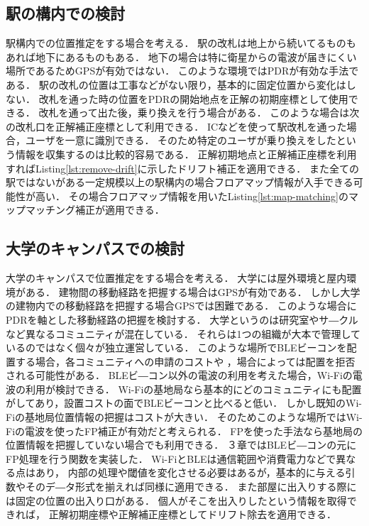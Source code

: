 \subsection{駅の構内での検討}
駅構内での位置推定をする場合を考える．
駅の改札は地上から続いてるものもあれば地下にあるものもある．
地下の場合は特に衛星からの電波が届きにくい場所であるためGPSが有効ではない．
このような環境ではPDRが有効な手法である．
駅の改札の位置は工事などがない限り，基本的に固定位置から変化はしない．
改札を通った時の位置をPDRの開始地点を正解の初期座標として使用できる．
改札を通って出た後，乗り換えを行う場合がある．
このような場合は次の改札口を正解補正座標として利用できる．
ICなどを使って駅改札を通った場合，ユーザを一意に識別できる．
そのため特定のユーザが乗り換えをしたという情報を収集するのは比較的容易である．
正解初期地点と正解補正座標を利用すればListing\ref{lst:remove-drift}に示したドリフト補正を適用できる．
また全ての駅ではないがある一定規模以上の駅構内の場合フロアマップ情報が入手できる可能性が高い．
その場合フロアマップ情報を用いたListing\ref{lst:map-matching}のマップマッチング補正が適用できる．

\subsection{大学のキャンパスでの検討}
大学のキャンパスで位置推定をする場合を考える．
大学には屋外環境と屋内環境がある．
建物間の移動経路を把握する場合はGPSが有効である．
しかし大学の建物内での移動経路を把握する場合GPSでは困難である．
このような場合にPDRを軸とした移動経路の把握を検討する．
大学というのは研究室やサ―クルなど異なるコミュニティが混在している．
それらは1つの組織が大本で管理しているのではなく個々が独立運営している．
このような場所でBLEビーコンを配置する場合，各コミュニティへの申請のコストや
，場合によっては配置を拒否される可能性がある．
BLEビ―コン以外の電波の利用を考えた場合，Wi-Fiの電波の利用が検討できる．
Wi-Fiの基地局なら基本的にどのコミュニティにも配置がしてあり，設置コストの面でBLEビーコンと比べると低い．
しかし既知のWi-Fiの基地局位置情報の把握はコストが大きい．
そのためこのような場所ではWi-Fiの電波を使ったFP補正が有効だと考えられる．
FPを使った手法なら基地局の位置情報を把握していない場合でも利用できる．
３章ではBLEビ―コンの元にFP処理を行う関数を実装した．
Wi-FiとBLEは通信範囲や消費電力などで異なる点はあり，
内部の処理や閾値を変化させる必要はあるが，基本的に与える引数やそのデ―タ形式を揃えれば同様に適用できる．
また部屋に出入りする際には固定の位置の出入り口がある．
個人がそこを出入りしたという情報を取得できれば，
正解初期座標や正解補正座標としてドリフト除去を適用できる．
